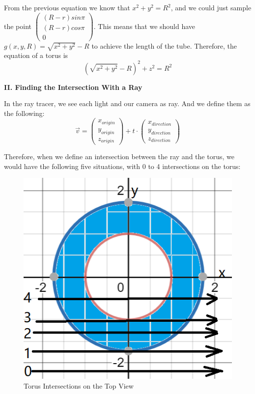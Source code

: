 \documentclass[a4paper,12pt]{report}
\begin{document}
From the previous equation we know that $x^2 +y^2 = R^2$, and we could just sample the point 
$\begin{pmatrix}
(R-r)sin\pi\\
(R-r)cos\pi\\
0
\end{pmatrix}$. This means that we should have $g(x,y,R)=\sqrt{x^2+y^2}-R$ to achieve the length of the tube. Therefore, the equation of a torus is
\begin{equation}
(\sqrt{x^2+y^2}-R)^2+z^2=R^2
\end{equation}

\noindent
\textbf{II. Finding the Intersection With a Ray}

In the ray tracer, we see each light and our camera as ray. And we define them as the following:
\begin{equation}
\overrightarrow{v} = \begin{pmatrix}
x_{origin}\\
y_{origin}\\
z_{origin}
\end{pmatrix} + t \cdot{
\begin{pmatrix}
x_{direction}\\
y_{direction}\\
z_{direction}
\end{pmatrix}}
\end{equation}

Therefore, when we define an intersection between the ray and the torus, we would have the following five situations, with 0 to 4 intersections on the torus:
\begin{figure}[h]
\centering
\includegraphics[scale=0.75]{./Pic/Torus4.png}
\caption{Torus Intersections on the Top View}
\end{figure}
\end{document}
